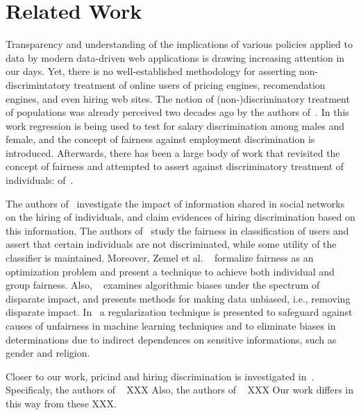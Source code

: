\section{Related Work}
\label{sect:related}
Transparency and understanding of the implications of various policies applied
to data by modern data-driven web applications is drawing increasing attention
in our days. Yet, there is no well-established methodology for asserting
non-discrimintatory treatment of online users of pricing engines,
recomendation engines, and even hiring web sites. The notion of
(non-)discriminatory treatment of populations was already perceived two decades
ago by the authors of~\cite{EmploymentDisc}. In this work regression is being
used to test for salary discrimination among males and female, and the concept
of fairness against employment discrimination is introduced. Afterwards,
there has been a large body of work that revisited the concept of fairness and
attempted to assert against discriminatory treatment of individuals:
of~\cite{HiringDiscrimination,FairnessAwareness,FairnessRegularization,
FairRepresentation,DisparateImpact}.

The authors of~\cite{HiringDiscrimination} investigate the impact of
information shared in social networks on the hiring of individuals, and claim
evidences of hiring discrimination based on this information. The authors
of~\cite{FairnessAwareness} study the fairness in classification of users and
assert that certain individuals are not discriminated, while some utility
of the classifier is maintained. Moreover, Zemel et al.
~\cite{FairRepresentation} formalize fairness as an optimization problem and
present a technique to achieve both individual and group fairness. Also,
~\cite{DisparateImpact} examines algorithmic biases under the spectrum of
disparate impact, and presents methods for making data unbiased, i.e., removing
disparate impact. In~\cite{FairnessRegularization} a regularization technique
is presented to safeguard against causes of unfairness in machine learning
techniques and to eliminate biases in determinations due to indirect
dependences on sensitive informations, such as gender and religion.

Closer to our work, pricind and hiring discrimination is investigated
in~\cite{PriceDiscrimination,HiringDiscrimination}. Specificaly, the authors of
~\cite{PriceDiscrimination} XXX
Also, the authors of ~\cite{HiringDiscrimination} XXX
Our work differs in this way from these XXX.
